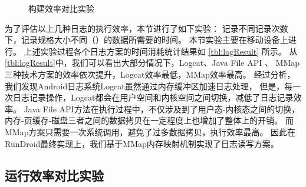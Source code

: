 {\begin{figure*}[!ht]
{\begin{threeparttable}[b]
\begin{tabular}{|c|c|c|c|c|c|c|c|}
				
				
			\end{tabular}
			
			
		\end{threeparttable}
	}


\caption{构建效率对比实验}

\label{tbl:logResult}
\end{figure*}


为了评估以上几种日志的执行效率，本节进行了如下实验：
记录不同记录次数下，记录规格大小不同（）的数据所需要的时间。
本节实验主要在移动设备上进行。
上述实验过程各个日志方案的时间消耗统计结果如 \autoref{tbl:logResult} 所示。
从\autoref{tbl:logResult}中，我们可以看出大部分情况下，Logcat、Java File API 、 MMap三种技术方案的效率依次提升，Logcat效率最低，MMap效率最高。
经过分析，我们发现Android日志系统Logcat虽然通过内存缓冲区加速日志处理，
但是，每一次日志记录操作，Logcat都会在用户空间和内核空间之间切换，减低了日志记录效率。
Java File API方法在执行过程中，不仅涉及到了用户态-内核态之间的切换，内存-页缓存-磁盘三者之间的数据拷贝在一定程度上也增加了整体上的开销。
而MMap方案只需要一次系统调用，避免了过多数据拷贝，执行效率最高。
因此在RunDroid最终实现上，我们基于MMap内存映射机制实现了日志读写方案。


\subsection{运行效率对比实验}


\begin{figure*}[!ht]
	\centering
	
\end{figure*}}
